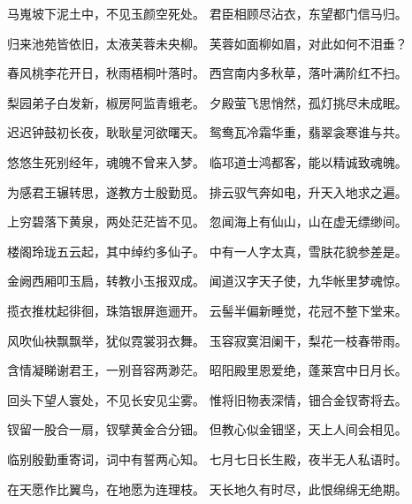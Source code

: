 \documentclass[12pt,a4paper]{article}
\begin{document}
马嵬坡下泥土中，不见玉颜空死处。
君臣相顾尽沾衣，东望都门信马归。

归来池苑皆依旧，太液芙蓉未央柳。
芙蓉如面柳如眉，对此如何不泪垂？

春风桃李花开日，秋雨梧桐叶落时。
西宫南内多秋草，落叶满阶红不扫。

梨园弟子白发新，椒房阿监青蛾老。
夕殿萤飞思悄然，孤灯挑尽未成眠。

迟迟钟鼓初长夜，耿耿星河欲曙天。
鸳鸯瓦冷霜华重，翡翠衾寒谁与共。

悠悠生死别经年，魂魄不曾来入梦。
临邛道士鸿都客，能以精诚致魂魄。

为感君王辗转思，遂教方士殷勤觅。
排云驭气奔如电，升天入地求之遍。

上穷碧落下黄泉，两处茫茫皆不见。
忽闻海上有仙山，山在虚无缥缈间。

楼阁玲珑五云起，其中绰约多仙子。
中有一人字太真，雪肤花貌参差是。

金阙西厢叩玉扃，转教小玉报双成。
闻道汉字天子使，九华帐里梦魂惊。

揽衣推枕起徘徊，珠箔银屏迤逦开。
云髻半偏新睡觉，花冠不整下堂来。

风吹仙袂飘飘举，犹似霓裳羽衣舞。
玉容寂寞泪阑干，梨花一枝春带雨。

含情凝睇谢君王，一别音容两渺茫。
昭阳殿里恩爱绝，蓬莱宫中日月长。

回头下望人寰处，不见长安见尘雾。
惟将旧物表深情，钿合金钗寄将去。

钗留一股合一扇，钗擘黄金合分钿。
但教心似金钿坚，天上人间会相见。

临别殷勤重寄词，词中有誓两心知。
七月七日长生殿，夜半无人私语时。

在天愿作比翼鸟，在地愿为连理枝。
天长地久有时尽，此恨绵绵无绝期。
\end{document}
